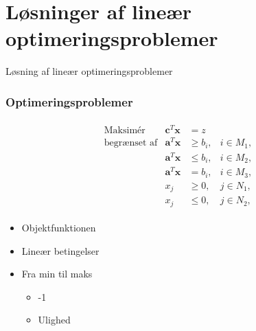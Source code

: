 \section{Løsninger af lineær optimeringsproblemer}
%
\begin{frame}
\centering
\Huge
Løsning af lineær optimeringsproblemer 
\end{frame}
%

\begin{frame}
\frametitle{Optimeringsproblemer}
\begin{align*}
\begin{array}{lrll}
\text{Maksimér}		&\textbf{c}^T\textbf{x}	& = z		&\\
\text{begrænset af}	&\textbf{a}^T\textbf{x}	&\geq b_i,	&i \in M_1,\\
					&\textbf{a}^T\textbf{x}	&\leq b_i,	&i \in M_2,\\
					&\textbf{a}^T\textbf{x}	& = b_i,	&i \in M_3,\\
					&x_j					&\geq 0,	&j \in N_1,\\
					&x_j					&\leq 0,	&j \in N_2,
\end{array}
\end{align*}
\begin{itemize}
\item Objektfunktionen
\item Lineær betingelser 
\item Fra min til maks 
\begin{itemize}
\item -1 
\item Ulighed
\end{itemize}
\end{itemize}
\end{frame}

